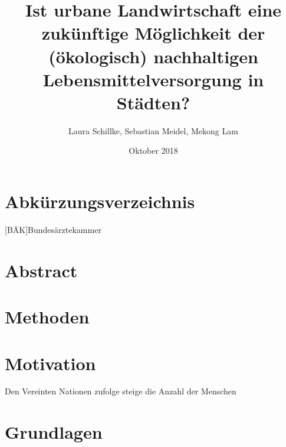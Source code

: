 \documentclass{scrartcl}
\title{Ist urbane Landwirtschaft eine zukünftige Möglichkeit der (ökologisch) nachhaltigen Lebensmittelversorgung in Städten?}
\author{Laura Schillke, Sebastian Meidel, Mekong Lam }
\date{Oktober 2018}
\begin{document}
\maketitle


\newpage

\setcounter{tocdepth}{3}
\tableofcontents 



\newpage
\section{Abkürzungsverzeichnis}

\begin{acronym}
	[BÄK]{Bundesärztekammer}
\end{acronym}


\newpage

\section{Abstract}

\section{Methoden}

\section{Motivation}
Den Vereinten Nationen zufolge steige die Anzahl der Menschen 





\section{Grundlagen}
\end{document}
